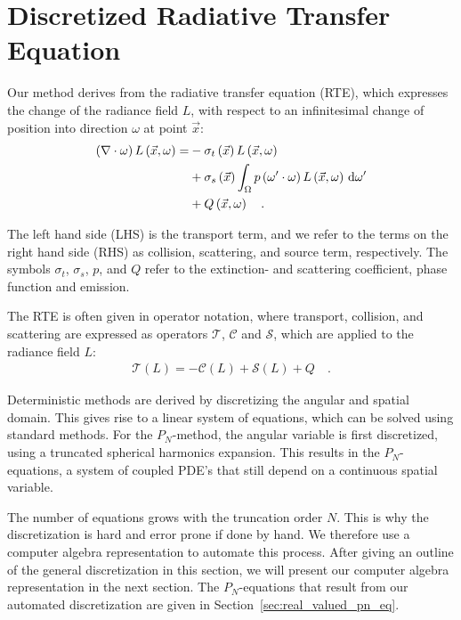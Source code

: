 \section{Discretized Radiative Transfer Equation}
\label{sec:discretized_rte}

Our method derives from the radiative transfer equation (RTE), which expresses the change of the radiance field $L$, with respect to an infinitesimal change of position into direction $\omega$ at point $\vec{x}$:
\begin{align}
\left(\nabla\cdot\omega\right)L\left(\vec{x}, \omega \right)
=&
-\sigma_t\left(\vec{x}\right) L\left(\vec{x}, \omega \right)\nonumber\\
&
+\sigma_s\left(\vec{x}\right) \int_{\Omega}
{
p\left(\omega'\cdot\omega\right)L\left(\vec{x}, \omega \right)\,\mathrm{d}\omega'
}\nonumber\\
&
+Q\left(\vec{x}, \omega\right)\nonumber
\quad .
\label{eq:rte}
\end{align}

The left hand side (LHS) is the transport term, and we refer to the terms on the right hand side (RHS) as collision, scattering, and source term, respectively. The symbols $\sigma_t$, $\sigma_s$, $p$, and $Q$ refer to the extinction- and scattering coefficient, phase function and emission.

The RTE is often given in operator notation, where transport, collision, and scattering are expressed as operators $\mathcal{T}$, $\mathcal{C}$ and $\mathcal{S}$, which are applied to the radiance field $L$:
\begin{align}
\mathcal{T}\left(L\right) = -\mathcal{C}\left(L\right) + \mathcal{S}\left(L\right) + Q
\quad .
\end{align}

Deterministic methods are derived by discretizing the angular and spatial domain. This gives rise to a linear system of equations, which can be solved using standard methods. For the $P_N$-method, the angular variable is first discretized, using a truncated spherical harmonics expansion. This results in the $P_N$-equations, a system of coupled PDE's that still depend on a continuous spatial variable.

The number of equations grows with the truncation order $N$. This is why the discretization is hard and error prone if done by hand. We therefore use a computer algebra representation to automate this process. After giving an outline of the general discretization in this section, we will present our computer algebra representation in the next section. The $P_N$-equations that result from our automated discretization are given in Section~\ref{sec:real_valued_pn_eq}. 

